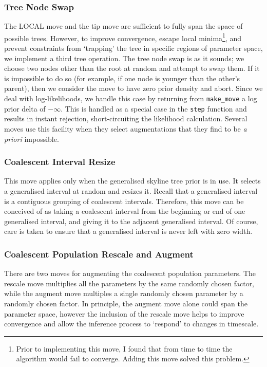 \documentclass[10pt,journal,compsoc]{IEEEtran}
\begin{document}
\subsubsection{Tree Node Swap}
The LOCAL move and the tip move are sufficient to fully span the space of possible trees. However, to improve convergence, escape local minima\footnote{Prior to implementing this move, I found that from time to time the algorithm would fail to converge. Adding this move solved this problem.}, and prevent constraints from `trapping' the tree in specific regions of parameter space, we implement a third tree operation. The tree node swap is as it sounds; we choose two nodes other than the root at random and attempt to swap them. If it is impossible to do so (for example, if one node is younger than the other's parent), then we consider the move to have zero prior density and abort. Since we deal with log-likelihoods, we handle this case by returning from \texttt{make\_move} a log prior delta of $-\infty$. This is handled as a special case in the \texttt{step} function and results in instant rejection, short-circuiting the likelihood calculation. Several moves use this facility when they select augmentations that they find to be \textit{a priori} impossible.

\subsubsection{Coalescent Interval Resize}

This move applies only when the generalised skyline tree prior is in use. It selects a generalised interval at random and resizes it. Recall that a generalised interval is a contiguous grouping of coalescent intervals. Therefore, this move can be conceived of as taking a coalescent interval from the beginning or end of one generalised interval, and giving it to the adjacent generalised interval. Of course, care is taken to ensure that a generalised interval is never left with zero width.

\subsubsection{Coalescent Population Rescale and Augment}

There are two moves for augmenting the coalescent population parameters. The rescale move multiplies all the parameters by the same randomly chosen factor, while the augment move multiples a single randomly chosen parameter by a randomly chosen factor. In principle, the augment move alone could span the parameter space, however the inclusion of the rescale move helps to improve convergence and allow the inference process to `respond' to changes in timescale.
\end{document}
